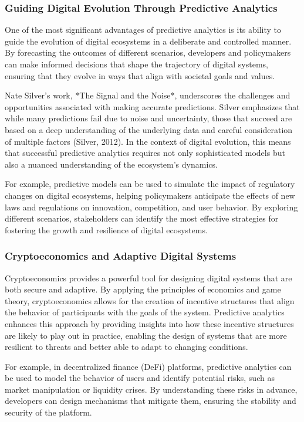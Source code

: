\documentclass[12pt,twoside]{article}
\begin{document}
\subsubsection{Guiding Digital Evolution Through Predictive Analytics}

One of the most significant advantages of predictive analytics is its ability to guide the evolution of digital ecosystems in a deliberate and controlled manner. By forecasting the outcomes of different scenarios, developers and policymakers can make informed decisions that shape the trajectory of digital systems, ensuring that they evolve in ways that align with societal goals and values.

Nate Silver's work, *The Signal and the Noise*, underscores the challenges and opportunities associated with making accurate predictions. Silver emphasizes that while many predictions fail due to noise and uncertainty, those that succeed are based on a deep understanding of the underlying data and careful consideration of multiple factors (Silver, 2012). In the context of digital evolution, this means that successful predictive analytics requires not only sophisticated models but also a nuanced understanding of the ecosystem's dynamics.

For example, predictive models can be used to simulate the impact of regulatory changes on digital ecosystems, helping policymakers anticipate the effects of new laws and regulations on innovation, competition, and user behavior. By exploring different scenarios, stakeholders can identify the most effective strategies for fostering the growth and resilience of digital ecosystems.


\subsubsection{Cryptoeconomics and Adaptive Digital Systems}

Cryptoeconomics provides a powerful tool for designing digital systems that are both secure and adaptive. By applying the principles of economics and game theory, cryptoeconomics allows for the creation of incentive structures that align the behavior of participants with the goals of the system. Predictive analytics enhances this approach by providing insights into how these incentive structures are likely to play out in practice, enabling the design of systems that are more resilient to threats and better able to adapt to changing conditions.

For example, in decentralized finance (DeFi) platforms, predictive analytics can be used to model the behavior of users and identify potential risks, such as market manipulation or liquidity crises. By understanding these risks in advance, developers can design mechanisms that mitigate them, ensuring the stability and security of the platform.
\end{document}
